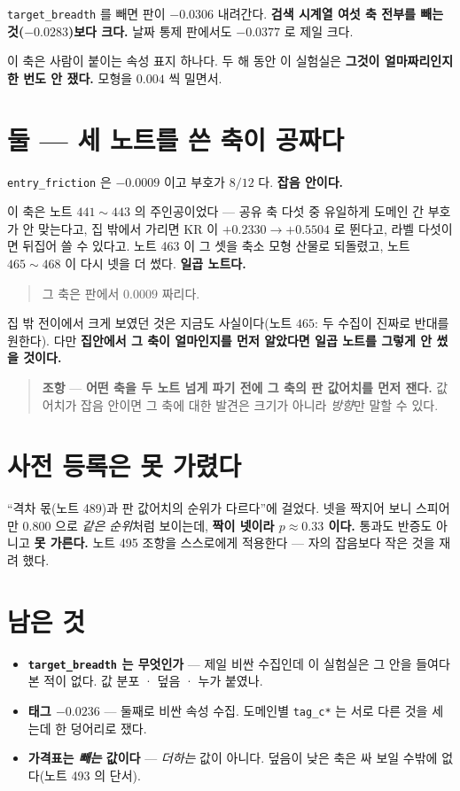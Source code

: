 \documentclass[11pt]{article}
\begin{document}
\texttt{target\_breadth} 를 빼면 판이 $-0.0306$ 내려간다. \textbf{검색
시계열 여섯 축 전부를 빼는 것($-0.0283$)보다 크다.} 날짜 통제 판에서도
$-0.0377$ 로 제일 크다.

이 축은 사람이 붙이는 속성 표지 하나다. 두 해 동안 이 실험실은
\textbf{그것이 얼마짜리인지 한 번도 안 쟀다.} 모형을 $0.004$ 씩 밀면서.

\section{둘 --- 세 노트를 쓴 축이 공짜다}

\texttt{entry\_friction} 은 $-0.0009$ 이고 부호가 $8/12$ 다. \textbf{잡음
안이다.}

이 축은 노트 $441 \sim 443$ 의 주인공이었다 --- 공유 축 다섯 중 유일하게
도메인 간 부호가 안 맞는다고, 집 밖에서 가리면 KR 이 $+0.2330 \to
+0.5504$ 로 뛴다고, 라벨 다섯이면 뒤집어 쓸 수 있다고. 노트 463 이 그
셋을 축소 모형 산물로 되돌렸고, 노트 $465 \sim 468$ 이 다시 넷을 더 썼다.
\textbf{일곱 노트다.}

\begin{quote}
그 축은 판에서 $0.0009$ 짜리다.
\end{quote}

집 밖 전이에서 크게 보였던 것은 지금도 사실이다(노트 $465$: 두 수집이
진짜로 반대를 원한다). 다만 \textbf{집안에서 그 축이 얼마인지를 먼저
알았다면 일곱 노트를 그렇게 안 썼을 것이다.}

\begin{quote}
\textbf{조항} --- \textbf{어떤 축을 두 노트 넘게 파기 전에 그 축의 판
값어치를 먼저 잰다.} 값어치가 잡음 안이면 그 축에 대한 발견은 크기가
아니라 \emph{방향}만 말할 수 있다.
\end{quote}

\section{사전 등록은 못 가렸다}

``격차 몫(노트 489)과 판 값어치의 순위가 다르다''에 걸었다. 넷을 짝지어
보니 스피어만 $0.800$ 으로 \emph{같은 순위}처럼 보이는데, \textbf{짝이
넷이라 $p \approx 0.33$ 이다.} 통과도 반증도 아니고 \textbf{못 가른다.}
노트 495 조항을 스스로에게 적용한다 --- 자의 잡음보다 작은 것을 재려
했다.

\section*{남은 것}

\begin{itemize}
\item \textbf{\texttt{target\_breadth} 는 무엇인가} --- 제일 비싼
수집인데 이 실험실은 그 안을 들여다본 적이 없다. 값 분포 · 덮음 ·
누가 붙였나.
\item \textbf{태그 $-0.0236$} --- 둘째로 비싼 속성 수집. 도메인별
\texttt{tag\_c*} 는 서로 다른 것을 세는데 한 덩어리로 쟀다.
\item \textbf{가격표는 \emph{빼는} 값이다} --- \emph{더하는} 값이 아니다.
덮음이 낮은 축은 싸 보일 수밖에 없다(노트 493 의 단서).
\end{itemize}
\end{document}
